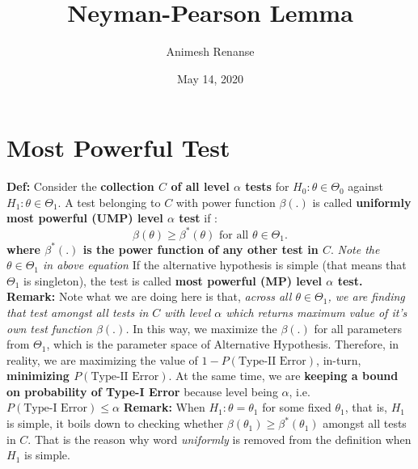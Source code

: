 \documentclass{article}
\title{Neyman-Pearson Lemma}
\author{Animesh Renanse}
\date{May 14, 2020}
\begin{document}
\maketitle
\newpage


\section{Most Powerful Test}
\textbf{Def:} Consider the \textbf{collection $C$ of all level $\alpha$ tests}  for $H_0 : \theta \in \Theta_0$ against $H_1 : \theta \in \Theta_1$. A test belonging to $C$ with power function $\beta\left( . \right) $ is called \textbf{uniformly most powerful (UMP) level $\alpha$ test} if :
\[
	\beta\left( \theta \right) \ge \beta^{*}\left( \theta \right) \text{ for all $\theta \in \Theta_1$}
.\] 
\textbf{where $\beta^{*}\left( . \right) $ is the power function of any other test in $C$}. \textit{Note the $\theta \in \Theta_1$ in above equation}
\newline\newline
If the alternative hypothesis is simple (that means that $\Theta_1$ is singleton), the test is called \textbf{most powerful (MP) level $\alpha$ test.}   
\newline\newline
\textbf{Remark: }Note what we are doing here is that, \textit{across all $\theta \in \Theta_1$, we are finding that test amongst all tests in $C$ with level $\alpha$ which returns maximum value of it's own test function $\beta\left( . \right) $.} 
In this way, we maximize the $\beta\left( . \right) $ for all parameters from $\Theta_1$, which is the parameter space of Alternative Hypothesis. Therefore, in reality, we are maximizing the value of $1 - P\left( \text{Type-II Error} \right) $, in-turn, \textbf{minimizing $P\left( \text{Type-II Error} \right) $}.
\newline
At the same time, we are \textbf{ keeping a bound on probability of Type-I Error} because level being $\alpha$, i.e. $P\left(\text{Type-I Error} \right) \le \alpha$
\newline\newline
\textbf{Remark: }When $H_1 : \theta = \theta_1$ for some fixed $\theta_1$, that is, $H_1$ is simple, it boils down to checking whether $\beta\left( \theta_1 \right) \ge \beta^{*}\left( \theta_1 \right) $ amongst all tests in $C$. That is the reason why word \textit{uniformly} is removed from the definition when $H_1$ is simple. 
\end{document}
